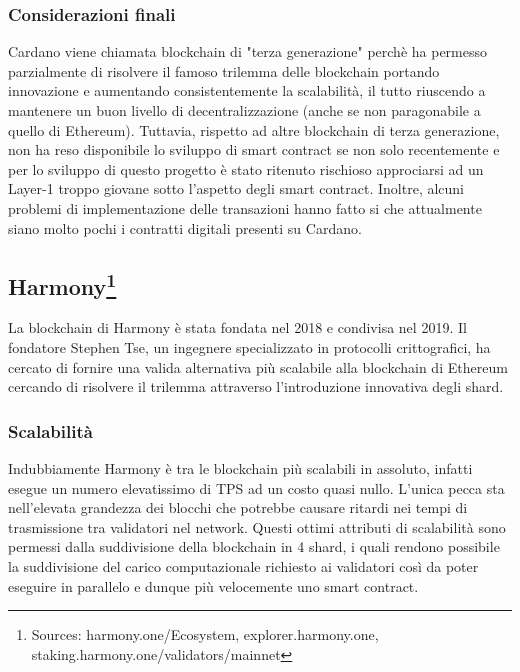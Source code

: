 \documentclass[a4paper, 12pt]{article}
\begin{document}
\subsubsection*{Considerazioni finali}
Cardano viene chiamata blockchain di "terza generazione" perchè ha permesso parzialmente di risolvere il famoso trilemma delle blockchain portando innovazione e aumentando consistentemente la scalabilità, il tutto riuscendo a mantenere un buon livello di decentralizzazione (anche se non paragonabile a quello di Ethereum). Tuttavia, rispetto ad altre blockchain di terza generazione, non ha reso disponibile lo sviluppo di smart contract se non solo recentemente e per lo sviluppo di questo progetto è stato ritenuto rischioso approciarsi ad un Layer-1 troppo giovane sotto l'aspetto degli smart contract.
Inoltre, alcuni problemi di implementazione delle transazioni hanno fatto si che attualmente siano molto pochi i contratti digitali presenti su Cardano.


\newpage
\subsection*{Harmony\footnote{Sources: harmony.one/Ecosystem, explorer.harmony.one, staking.harmony.one/validators/mainnet}}
La blockchain di Harmony è stata fondata nel 2018 e condivisa nel 2019. Il fondatore Stephen Tse, un ingegnere specializzato in protocolli crittografici, ha cercato di fornire una valida alternativa più scalabile alla blockchain di Ethereum cercando di risolvere il trilemma attraverso l'introduzione innovativa degli shard.
\subsubsection*{Scalabilità}
Indubbiamente Harmony è tra le blockchain più scalabili in assoluto, infatti esegue un numero elevatissimo di TPS ad un costo quasi nullo. L'unica pecca sta nell'elevata grandezza dei blocchi che potrebbe causare ritardi nei tempi di trasmissione tra validatori nel network. Questi ottimi attributi di scalabilità sono permessi dalla suddivisione della blockchain in 4 shard, i quali rendono possibile la suddivisione del carico computazionale richiesto ai validatori così da poter eseguire in parallelo e dunque più velocemente uno smart contract.
\end{document}
